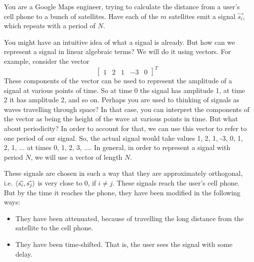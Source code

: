 

You are a Google Maps engineer, trying to calculate the distance from a user's cell phone to a bunch of satellites. Have each of the $m$ satellites emit a signal $\vec{s_i}$, which repeats with a period of $N$. 

You might have an intuitive idea of what a signal is already. But how can we represent a signal in linear algebraic terms? We will do it using vectors. For example, consider the vector
$$\begin{bmatrix} 1 & 2 & 1 & -3 & 0\end{bmatrix}^T$$
These components of the vector can be used to represent the amplitude of a signal at various points of time. So at time 0 the signal has amplitude 1, at time 2 it has amplitude 2, and so on. Perhaps you are used to thinking of signals as waves travelling through space? In that case, you can interpret the components of the vector as being the height of the wave at various points in time. But what about periodicity? In order to account for that, we can use this vector to refer to one period of our signal. So, the actual signal would take values 1, 2, 1, -3, 0, 1, 2, 1, ... at times 0, 1, 2, 3, ....
In general, in order to represent a signal with period $N$, we will use a vector of length $N$.


These signals are chosen in such a way that they are approximately orthogonal, i.e. $\left\langle \vec{s_i}, \vec{s_j} \right\rangle$ is very close to 0, if $i \neq j$. These signals reach the user's cell phone. But by the time it reaches the phone, they have been modified in the following ways:

\begin{itemize}
    \item They have been attenuated, because of travelling the long distance from the satellite to the cell phone.
    \item They have been time-shifted. That is, the user sees the signal with some delay.
\end{itemize}


